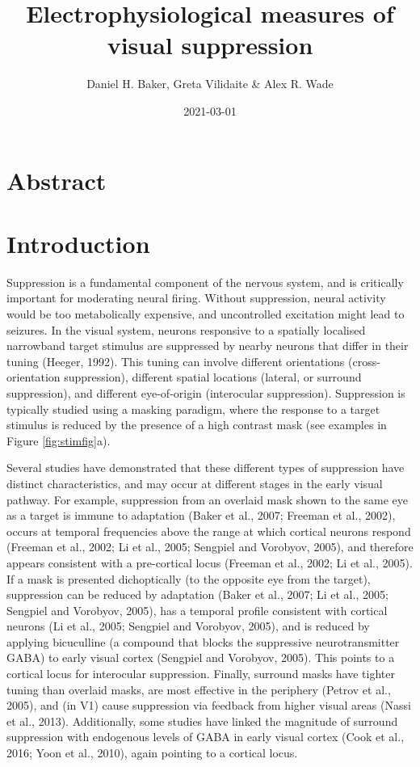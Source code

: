 \documentclass[]{article}
\title{Electrophysiological measures of visual suppression}
\author{Daniel H. Baker, Greta Vilidaite \& Alex R. Wade}
\date{2021-03-01}
\begin{document}
\maketitle

\hypertarget{abstract}{%
\section{Abstract}\label{abstract}}

\hypertarget{introduction}{%
\section{Introduction}\label{introduction}}

Suppression is a fundamental component of the nervous system, and is critically important for moderating neural firing. Without suppression, neural activity would be too metabolically expensive, and uncontrolled excitation might lead to seizures. In the visual system, neurons responsive to a spatially localised narrowband target stimulus are suppressed by nearby neurons that differ in their tuning (Heeger, 1992). This tuning can involve different orientations (cross-orientation suppression), different spatial locations (lateral, or surround suppression), and different eye-of-origin (interocular suppression). Suppression is typically studied using a masking paradigm, where the response to a target stimulus is reduced by the presence of a high contrast mask (see examples in Figure \ref{fig:stimfig}a).

Several studies have demonstrated that these different types of suppression have distinct characteristics, and may occur at different stages in the early visual pathway. For example, suppression from an overlaid mask shown to the same eye as a target is immune to adaptation (Baker et al., 2007; Freeman et al., 2002), occurs at temporal frequencies above the range at which cortical neurons respond (Freeman et al., 2002; Li et al., 2005; Sengpiel and Vorobyov, 2005), and therefore appears consistent with a pre-cortical locus (Freeman et al., 2002; Li et al., 2005). If a mask is presented dichoptically (to the opposite eye from the target), suppression can be reduced by adaptation (Baker et al., 2007; Li et al., 2005; Sengpiel and Vorobyov, 2005), has a temporal profile consistent with cortical neurons (Li et al., 2005; Sengpiel and Vorobyov, 2005), and is reduced by applying bicuculline (a compound that blocks the suppressive neurotransmitter GABA) to early visual cortex (Sengpiel and Vorobyov, 2005). This points to a cortical locus for interocular suppression. Finally, surround masks have tighter tuning than overlaid masks, are most effective in the periphery (Petrov et al., 2005), and (in V1) cause suppression via feedback from higher visual areas (Nassi et al., 2013). Additionally, some studies have linked the magnitude of surround suppression with endogenous levels of GABA in early visual cortex (Cook et al., 2016; Yoon et al., 2010), again pointing to a cortical locus.
\end{document}
